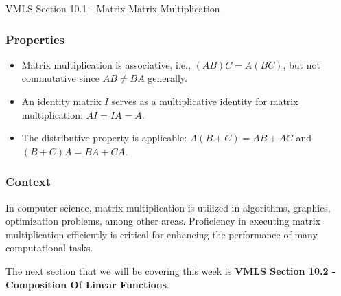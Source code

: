 \begin{notes}{VMLS Section 10.1 - Matrix-Matrix Multiplication}
    
    
    \subsubsection*{Properties}
    \begin{itemize}
        \item Matrix multiplication is associative, i.e., $(AB)C = A(BC)$, but not commutative since $AB \neq BA$ generally.
        \item An identity matrix $I$ serves as a multiplicative identity for matrix multiplication: $AI = IA = A$.
        \item The distributive property is applicable: $A(B + C) = AB + AC$ and $(B + C)A = BA + CA$.
    \end{itemize}
    
    \subsubsection*{Context}
    In computer science, matrix multiplication is utilized in algorithms, graphics, optimization problems, among other areas. Proficiency in executing matrix multiplication efficiently is critical for 
    enhancing the performance of many computational tasks.
\end{notes}

The next section that we will be covering this week is \textbf{VMLS Section 10.2 - Composition Of Linear Functions}.

